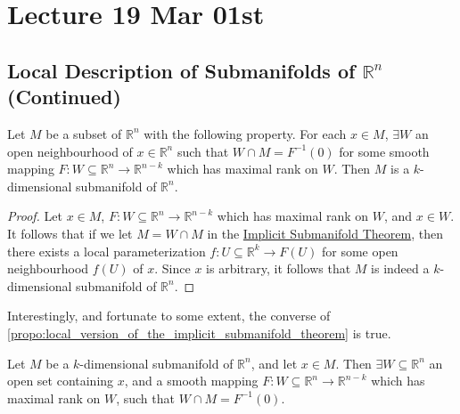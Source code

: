\documentclass[notoc,notitlepage]{tufte-book}
\begin{document}


\chapter{Lecture 19 Mar 01st}%
\label{chp:lecture_19_mar_01st}

\section{Local Description of Submanifolds of \texorpdfstring{$\mathbb{R}^n$}{Rn} (Continued)}%
\label{sec:local_description_of_submanifolds_of_r_n_continued}

\begin{propo}\label{propo:local_version_of_the_implicit_submanifold_theorem}
  Let $M$ be a subset of $\mathbb{R}^n$ with the following property. For each $x
  \in M$, $\exists W$ an open neighbourhood of $x \in \mathbb{R}^n$ such that
  $W \cap M = F^{-1}(0)$ for some smooth mapping $F : W \subseteq \mathbb{R}^n
  \to \mathbb{R}^{n - k}$ which has maximal rank on $W$. Then $M$ is a
  $k$-dimensional submanifold of $\mathbb{R}^n$.
\end{propo}

\begin{proof}
  Let $x \in M$, $F : W \subseteq \mathbb{R}^n \to \mathbb{R}^{n - k}$ which has
  maximal rank on $W$, and $x \in W$. It follows that if we let $M = W \cap M$
  in the \hyperref[thm:implicit_submanifold_theorem]{Implicit Submanifold
  Theorem}, then there exists a local parameterization $f : U \subseteq
  \mathbb{R}^k \to F(U)$ for some open neighbourhood $f(U)$ of $x$. Since $x$ is
  arbitrary, it follows that $M$ is indeed a $k$-dimensional submanifold of
  $\mathbb{R}^n$.
\end{proof}

Interestingly, and fortunate to some extent, the converse of \\
\noindent
\cref{propo:local_version_of_the_implicit_submanifold_theorem} is true.

\begin{propo}\label{propo:converse_of_the_local_version_of_the_implicit_submanifold_theorem}
  Let $M$ be a $k$-dimensional submanifold of $\mathbb{R}^n$, and let $x \in M$.
  Then $\exists W \subseteq \mathbb{R}^n$ an open set containing $x$, and a
  smooth mapping $F : W \subseteq \mathbb{R}^n \to \mathbb{R}^{n - k}$ which has
  maximal rank on $W$, such that $W \cap M = F^{-1}(0)$.
\end{propo}
\end{document}

